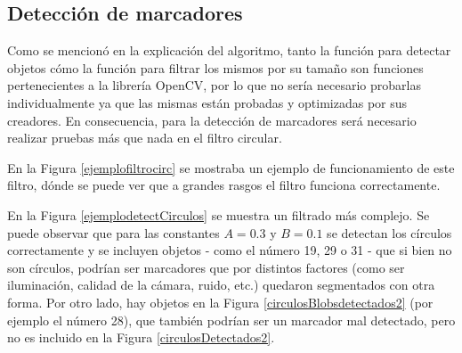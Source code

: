 \subsection{Detección de marcadores}

Como se mencionó en la explicación del algoritmo, tanto la función para detectar objetos cómo la función para filtrar los mismos por su tamaño son funciones pertenecientes a la librería OpenCV, por lo que no sería necesario probarlas individualmente ya que las mismas están probadas y optimizadas por sus creadores. En consecuencia, para la detección de marcadores será necesario realizar pruebas más que nada en el filtro circular.

En la Figura \ref{ejemplofiltrocirc} se mostraba un ejemplo de funcionamiento de este filtro, dónde se puede ver que a grandes rasgos el filtro funciona correctamente. 

En la Figura \ref{ejemplodetectCirculos} se muestra un filtrado más complejo. Se puede observar que para las constantes $A=0.3$ y $B=0.1$ se detectan los círculos correctamente y se incluyen objetos - como el número 19, 29 o 31 - que si bien no son círculos, podrían ser marcadores que por distintos factores (como ser iluminación, calidad de la cámara, ruido, etc.) quedaron segmentados con otra forma. Por otro lado, hay objetos en la Figura \ref{circulosBlobsdetectados2} (por ejemplo el número 28), que también podrían ser un marcador mal detectado, pero no es incluido en la Figura \ref{circulosDetectados2}.


